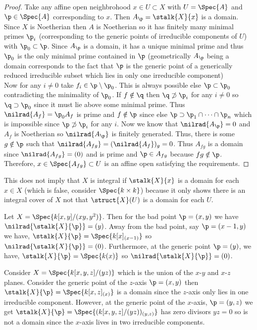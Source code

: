 \documentclass[12pt]{article}
\begin{document}
\begin{proof}
Take any affine open neighbrohood $x \in U \subset X$ with $U = \Spec{A}$ and $\p \in \Spec{A}$ corresponding to $x$. Then $A_\p = \stalk{X}{x}$ is a domain. Since $X$ is Noetherian then $A$ is Noetherian so it has finitely many minimal primes $\p_i$ (corresponding to the generic points of irreducible components of $U$) with $\p_0 \subset \p$. Since $A_\p$ is a domain, it has a unique minimal prime and thus $\p_0$ is the only minimal prime contained in $\p$ (geometrically $A_\p$ being a domain corresponds to the fact that $\p$ is the generic point of a generically reduced irreducible subset which lies in only one irreducible component)
\bigskip\\
Now for any $i \neq 0$ take $f_i \in \p \setminus \p_0$. This is always possible else $\p \subset \p_0$ contradicting the minimality of $\p_0$. If $f \notin \q$ then $\q \not\supset \p_i$ for any $i \neq 0$ so $\q \supset \p_0$ since it must lie above some minimal prime. Thus $\nilrad{A_f} = \p_0 A_f$ is prime and $f \notin \p$ since else $\p \supset \p_1 \cap \cdots \cap \p_n$ which is impossible since $\p \not\supset \p_i$ for any $i$. Now we know that $\nilrad{A_\p} = 0$ and $A_f$ is Noetherian so $\nilrad{A_\p}$ is finitely generated. Thus, there is some $g \notin \p$ such that $\nilrad{A_{fg}} = (\nilrad{A_f})_g = 0$. Thus $A_{fg}$ is a domain since $\nilrad{A_{fg}} = (0)$ and is prime and $\p \in A_{fg}$ because $fg \notin \p$. Therefore, $x \in \Spec{A_{fg}} \subset U$ is an affine open satisfying the requirements. 
\end{proof}

\begin{rmk}
This does not imply that $X$ is integral if $\stalk{X}{x}$ is a domain for each $x \in X$ (which is false, consider $\Spec{k \times k}$) because it only shows there is an integral cover of $X$ not that $\struct{X}(U)$ is a domain for each $U$. 
\end{rmk}

\begin{example}
Let $X = \Spec{k[x,y]/(xy, y^2)}$. Then for the bad point $\p = (x, y)$ we have $\nilrad{\stalk{X}{\p}} = (y)$. Away from the bad point, say $\p = (x - 1, y)$ we have, $\stalk{X}{\p} = \Spec{k[x]_{(x-1)}}$ so $\nilrad{\stalk{X}{\p}} = (0)$. Furthermore, at the generic point $\p = (y)$, we have, $\stalk{X}{\p} = \Spec{k(x)}$ so $\nilrad{\stalk{X}{\p}} = (0)$. 
\end{example}

\begin{example}
Consider $X = \Spec{k[x,y,z]/(yz)}$ which is the union of the $x$-$y$ and $x$-$z$ planes. Consider the generic point of the $z$-axis $\p = (x, y)$ then $\stalk{X}{\p} = \Spec{k[x, z]_{(x)}}$ is a domain since the $z$-axis only lies in one irreducible component. However, at the generic point of the $x$-axis, $\p = (y, z)$ we get $\stalk{X}{\p} = \Spec{(k[x, y, z]/(yz))_{(y, z)}}$ has zero divisors $yz = 0$ so is not a domain since the $x$-axis lives in two irreducible components.
\end{example}
\end{document}
